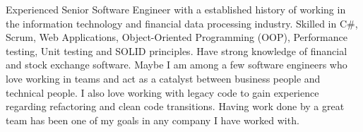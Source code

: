 \documentclass[9pt]{developercv} %
\begin{document}
\vspace{0.5cm}



\begin{minipage}[t]{0.4\textwidth} %
	\vspace{-\baselineskip} %
	
Experienced Senior Software Engineer with a established history of working in the information technology and financial data processing industry. Skilled in C\#, Scrum, Web Applications, Object-Oriented Programming (OOP), Performance testing, Unit testing and SOLID principles. Have strong knowledge of financial and stock exchange software. Maybe I am among a few software engineers who love working in teams and act as a catalyst between business people and technical people. I also love working with legacy code to gain experience regarding refactoring and clean code transitions. Having work done by a great team has been one of my goals in any company I have worked with.
\end{minipage}
\hfill %
\begin{minipage}[t]{0.5\textwidth} %
	\vspace{-\baselineskip} %
	\begin{barchart}{5.5}
	\end{barchart}
\end{minipage}



\end{document}
